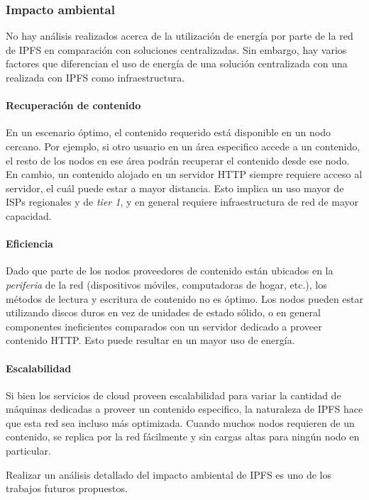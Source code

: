 \subsubsection{Impacto ambiental}

No hay análisis realizados acerca de la utilización de energía por parte de la red de IPFS en comparación con soluciones centralizadas. Sin embargo, hay varios factores que diferencian el uso de energía de una solución centralizada con una realizada con IPFS como infraestructura.

\paragraph{Recuperación de contenido} En un escenario óptimo, el contenido requerido está disponible en un nodo cercano. Por ejemplo, si otro usuario en un área especifico accede a un contenido, el resto de los nodos en ese área podrán recuperar el contenido desde ese nodo. En cambio, un contenido alojado en un servidor HTTP siempre requiere acceso al servidor, el cuál puede estar a mayor distancia. Esto implica un uso mayor de ISPs regionales y de \textit{tier 1}, y en general requiere infraestructura de red de mayor capacidad.

\paragraph{Eficiencia} Dado que parte de los nodos proveedores de contenido están ubicados en la \textit{periferia} de la red (dispositivos móviles, computadoras de hogar, etc.), los métodos de lectura y escritura de contenido no es óptimo. Los nodos pueden estar utilizando discos duros en vez de unidades de estado sólido, o en general componentes ineficientes comparados con un servidor dedicado a proveer contenido HTTP. Esto puede resultar en un mayor uso de energía.

\paragraph{Escalabilidad} Si bien los servicios de cloud proveen escalabilidad para variar la cantidad de máquinas dedicadas a proveer un contenido especifico, la naturaleza de IPFS hace que esta red sea incluso más optimizada. Cuando muchos nodos requieren de un contenido, se replica por la red fácilmente y sin cargas altas para ningún nodo en particular.

Realizar un análisis detallado del impacto ambiental de IPFS es uno de los trabajos futuros propuestos.


